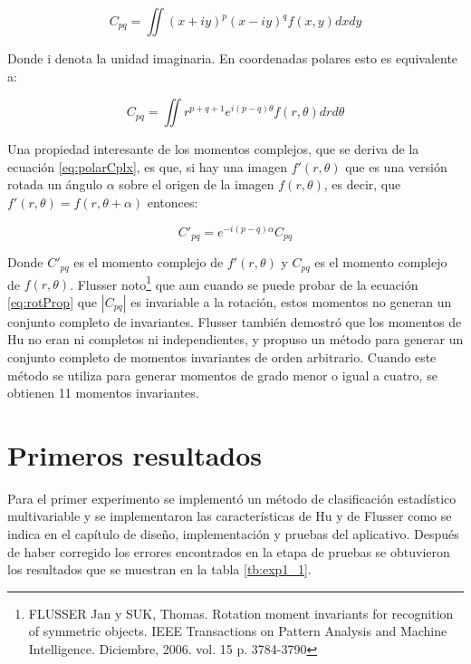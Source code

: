 \documentclass[a4paper, 11pt, oneside]{report}
\begin{document}
	\[ C_{pq} = \iint{ (x+iy)^p (x-iy)^q f(x,y) dx dy } \]
	
Donde i denota la unidad imaginaria. En coordenadas polares esto es equivalente a:

	\begin{equation}\label{eq:polarCplx}
		C_{pq} = \iint{ r^{p+q+1}e^{i(p-q)\theta}f(r,\theta) dr d\theta }
	\end{equation}

Una propiedad interesante de los momentos complejos, que se deriva de la ecuación \ref{eq:polarCplx}, es que, si hay una imagen $f'(r,\theta)$ que es una versión rotada un ángulo $\alpha$ sobre el origen de la imagen $f(r,\theta)$, es decir, que $f'(r,\theta) = f(r,\theta+\alpha)$ entonces:

\begin{equation}\label{eq:rotProp}
	C'_{pq} = e^{-i(p-q)\alpha}C_{pq}
\end{equation}

Donde $C'_{pq}$ es el momento complejo de $f'(r,\theta)$ y $C_{pq}$ es el momento complejo de $f(r,\theta)$. Flusser noto\footnote{FLUSSER Jan y SUK, Thomas. Rotation moment invariants for recognition of symmetric objects. IEEE Transactions on Pattern Analysis and Machine Intelligence. Diciembre, 2006. vol. 15 p. 3784-3790} que aun cuando se puede probar de la ecuación \ref{eq:rotProp} que $|C_{pq}|$ es invariable a la rotación, estos momentos no generan un conjunto completo de invariantes. Flusser también demostró que los momentos de Hu no eran ni completos ni independientes, y propuso un método para generar un conjunto completo de momentos invariantes de orden arbitrario. Cuando este método se utiliza para generar momentos de grado menor o igual a cuatro, se obtienen 11 momentos invariantes.

\section{Primeros resultados}
\label{sect:exp}

Para el primer experimento se implementó un método de clasificación estadístico multivariable y se implementaron las características de Hu y de Flusser como se indica en el capítulo de diseño, implementación y pruebas del aplicativo. Después de haber corregido los errores encontrados en la etapa de pruebas se obtuvieron los resultados que se muestran en la tabla \ref{tb:exp1_1}.
\end{document}
